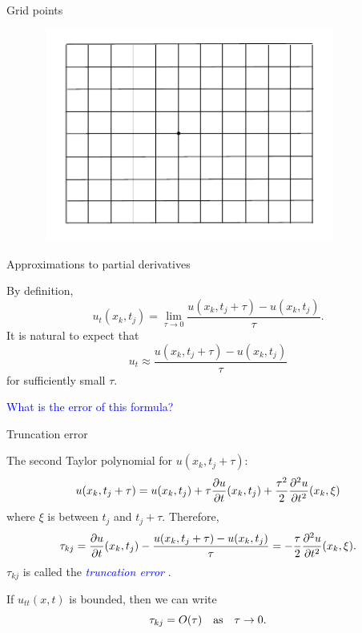 \documentclass{beamer}
\begin{document}
\begin{frame}{Grid points}

\begin{figure}[h]
\centering
\includegraphics[width=10cm,height=7cm]{../Lecture_notes/basic_grid2.pdf}
\end{figure}

\vskip 10mm

\end{frame}



\begin{frame}{Approximations to partial derivatives}

By definition,
\[
u_{t}(x_k,t_j)=\lim_{\tau\to 0}\frac{u(x_k,t_j+\tau)-u(x_k,t_j)}{\tau}.
\]
It is natural to expect that
\[
u_{t}\approx \frac{u(x_k,t_j+\tau)-u(x_k,t_j)}{\tau}
\]
for sufficiently small $\tau$.

\vskip 5mm
\textcolor{blue}{What is the error of this formula?}

\end{frame}



\begin{frame}{Truncation error}

The second Taylor polynomial for $u(x_k,t_j+\tau)$:
\[
u(x_k,t_j+\tau)=u(x_k,t_j)+\tau \frac{\partial u}{\partial t}(x_k,t_j)+
\frac{\tau^2}{2}\frac{\partial^2 u}{\partial t^2}(x_k,\xi)
\]
where $\xi$ is between $t_j$ and $t_j+\tau$. Therefore,
\[
\tau_{kj}=\frac{\partial u}{\partial t}(x_k,t_j)-\frac{u(x_k,t_j+\tau)-u(x_k,t_j)}{\tau}=
-\frac{\tau}{2}\frac{\partial^2 u}{\partial t^2}(x_k,\xi).
\]
$\tau_{kj}$ is called the \textcolor{blue}{{\em truncation error }}.

\vskip 5mm
If $u_{tt}(x,t)$ is bounded, then
we can write
\[
\tau_{kj}=O(\tau) \quad {\rm as} \quad \tau\to 0.
\]

\end{frame}
\end{document}
